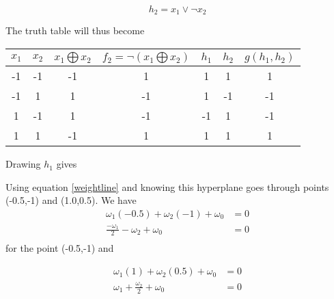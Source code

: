 \documentclass[10pt,a4paper]{article}
\begin{document}
\begin{equation}
h_2 = x_1 \vee \neg x_2
\end{equation}

The truth table will thus become

\begin{tabular}{|c|c|c|c|c|c|c|}
\hline
$x_1$ & $x_2$ & $x_1 \bigoplus x_2$ & $f_2 =\neg (x_1 \bigoplus x_2)$ & $h_1$ & $h_2$ &$g(h_1,h_2)$\\
\hline
-1 &-1 &-1 & 1 & 1 & 1 & 1  \\
-1 & 1 & 1 &-1 & 1 &-1 & -1 \\
 1 &-1 & 1 &-1 &-1 & 1 & -1 \\
 1 & 1 &-1 & 1 & 1 & 1 & 1  \\
\hline
\end{tabular}

Drawing $h_1$ gives

\begin{center}
\end{center}

Using equation \ref{weightline} and knowing this hyperplane goes through points (-0.5,-1) and (1.0,0.5).
We have  
\begin{equation}
\label{2bh1p1}
\begin{split}
\omega_1(-0.5) + \omega_2(-1) + \omega_0 &= 0 \\
\frac{-\omega_1}{2} - \omega_2 + \omega_0 &= 0 \\
\end{split}
\end{equation}
for the point (-0.5,-1) and

\begin{equation}
\label{2bh1p2}
\begin{split}
\omega_1(1) + \omega_2(0.5) + \omega_0 &= 0 \\
\omega_1 + \frac{\omega_2}{2} + \omega_0 &= 0 \\
\end{split}
\end{equation}
\end{document}

